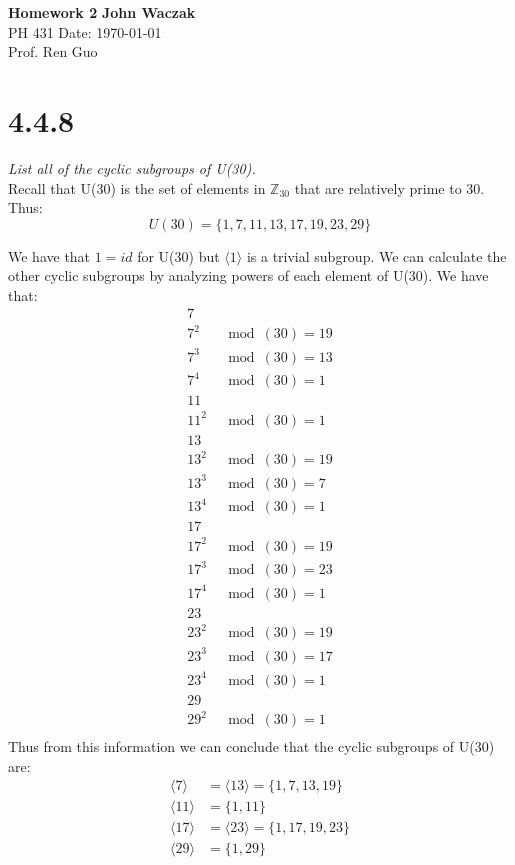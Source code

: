 \documentclass[a4paper, 11pt]{article}
\begin{document}
	\noindent
	\large\textbf{Homework 2} \hfill \textbf{John Waczak} \\
	\normalsize PH 431 \hfill  Date: \today \\
	Prof. Ren Guo \\ 

\section*{4.4.8}
\textit{List all of the cyclic subgroups of U(30).}\\

\noindent Recall that U(30) is the set of elements in $\mathbb{Z}_{30}$ that are relatively prime to 30. Thus: 
	\begin{equation*}
		U(30) = \{1,7,11,13,17,19,23,29\}
	\end{equation*}

We have that $1 = id$ for U(30) but $\langle 1 \rangle$ is a trivial subgroup. We can calculate the other cyclic subgroups by analyzing powers of each element of U(30). We have that: 
	\begin{align*}
		7& \\ 
		7^2& \mod(30) = 19 \\ 
		7^3& \mod(30) = 13 \\ 
		7^4& \mod(30) = 1 \\
		11& \\ 
		11^2& \mod(30) = 1 \\ 
		13& \\
		13^2& \mod(30) = 19 \\ 
		13^3& \mod(30) = 7 \\ 
		13^4& \mod(30) = 1 \\ 
		17 \\ 
		17^2& \mod(30) = 19 \\ 
		17^3& \mod(30) = 23 \\ 
		17^4& \mod(30) = 1 \\ 
		23 \\ 
		23^2& \mod(30) = 19 \\ 
		23^3& \mod(30) = 17 \\ 	
		23^4& \mod(30) = 1 \\ 
		29& \\ 
		29^2& \mod(30) = 1 \\ 	 
	\end{align*}
Thus from this information we can conclude that the cyclic subgroups of U(30) are: 
	\begin{align*}
		\langle 7 \rangle &= \langle 13 \rangle = \{ 1, 7, 13, 19\} \\ 
		\langle 11 \rangle &= \{ 1, 11 \} \\ 
		\langle 17 \rangle &= \langle 23 \rangle = \{1, 17, 19, 23 \} \\ 
		\langle 29 \rangle &= \{ 1, 29 \}
	\end{align*}
	
\end{document}
